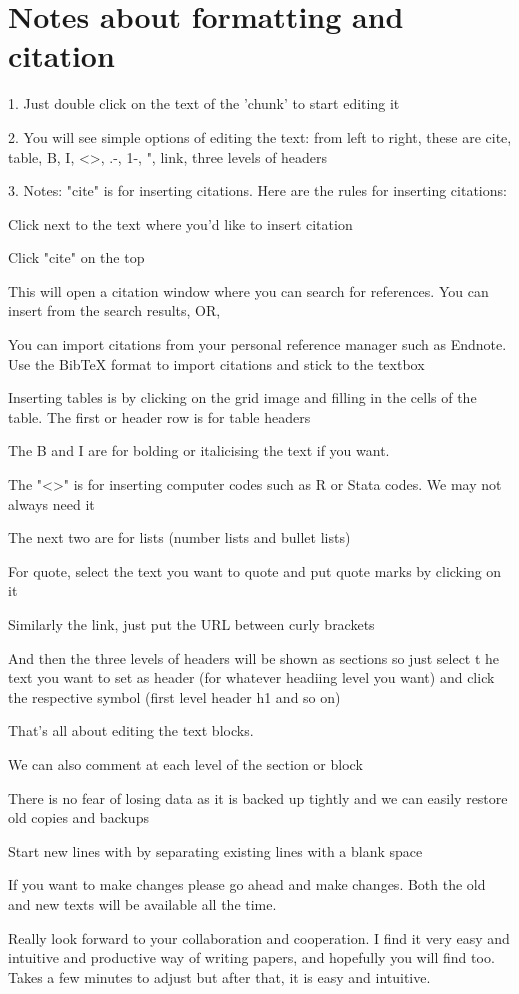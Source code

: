 \section{Notes about formatting and citation}

1. Just double click on the text of the 'chunk' to start editing it

2. You will see simple options of editing the text: from left to right, these are cite, table, B, I, <>, .-, 1-, ", link, three levels of headers

3. Notes: "cite" is for inserting citations. Here are the rules for inserting citations:

Click next to the text where you'd like to insert citation

Click "cite" on the top

This will open a citation window where you can search for references. You can insert from the search results, OR,

You can import citations from your personal reference manager such as  Endnote. Use the BibTeX format to import citations and stick to the textbox

Inserting tables is by clicking on the grid image and  filling in the cells of the table. The first or header row is for table headers

The  B and I are for bolding or italicising the text if you want. 

The "<>" is for inserting computer codes such as R or Stata codes. We may not always need it

The next two are for lists (number lists and bullet lists)

For quote, select the text you want to  quote and put quote marks by clicking on it

Similarly the link, just put the URL between curly brackets 

And then the three levels of headers will be shown as sections so just select t he text you want to set as header (for whatever headiing level you want) and click the respective symbol (first level header h1 and so on)

That's all about editing the text blocks.

We can also comment at each  level of the section or block

There is no fear of losing data as it is backed up tightly and we can easily restore  old copies and backups

Start new lines with by separating existing lines with a blank space

If you want to make changes  please go ahead and make changes.  Both the old and new texts will be available all the time.

Really look forward to your collaboration and cooperation. I find it very easy and intuitive and productive way of writing papers, and hopefully  you will find too. Takes a few minutes to adjust but after that, it is easy and intuitive. 



